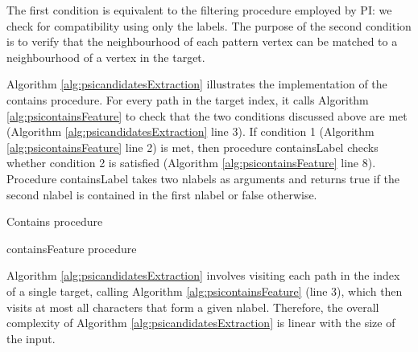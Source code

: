 \documentclass{l4proj}
\begin{document}
The first condition is equivalent to the filtering procedure employed by PI: we check for compatibility using only the labels. The purpose of the second condition is to verify that the neighbourhood of each pattern vertex can be matched to a neighbourhood of a vertex in the target.

Algorithm \ref{alg:psicandidatesExtraction} illustrates the implementation of the contains procedure. For every path in the target index, it calls Algorithm \ref{alg:psicontainsFeature} to check that the two conditions discussed above are met (Algorithm \ref{alg:psicandidatesExtraction} line 3). If condition 1 (Algorithm \ref{alg:psicontainsFeature} line 2) is met, then procedure containsLabel checks whether condition 2 is satisfied (Algorithm \ref{alg:psicontainsFeature} line 8). Procedure containsLabel takes two nlabels as arguments and returns true if the second nlabel is contained in the first nlabel or false otherwise.
\begin{algorithm}
\centering
\caption{Contains procedure}
\label{alg:psicandidatesExtraction}
\begin{algorithmic}[1]
 
    \EndIf
\EndFor
{}
\EndProcedure
\end{algorithmic}
\end{algorithm}

\begin{algorithm}
\centering
\caption{containsFeature procedure}
\label{alg:psicontainsFeature}
\begin{algorithmic}[1]
  
\EndIf
{} 
\EndIf
{} 
    \EndIf
\EndFor
{}
\EndProcedure
\end{algorithmic}
\end{algorithm}

Algorithm \ref{alg:psicandidatesExtraction} involves visiting each path in the index of a single target, calling Algorithm \ref{alg:psicontainsFeature} (line 3), which then visits at most all characters that form a given nlabel. Therefore, the overall complexity of Algorithm \ref{alg:psicandidatesExtraction} is linear with the size of the input.
\end{document}
